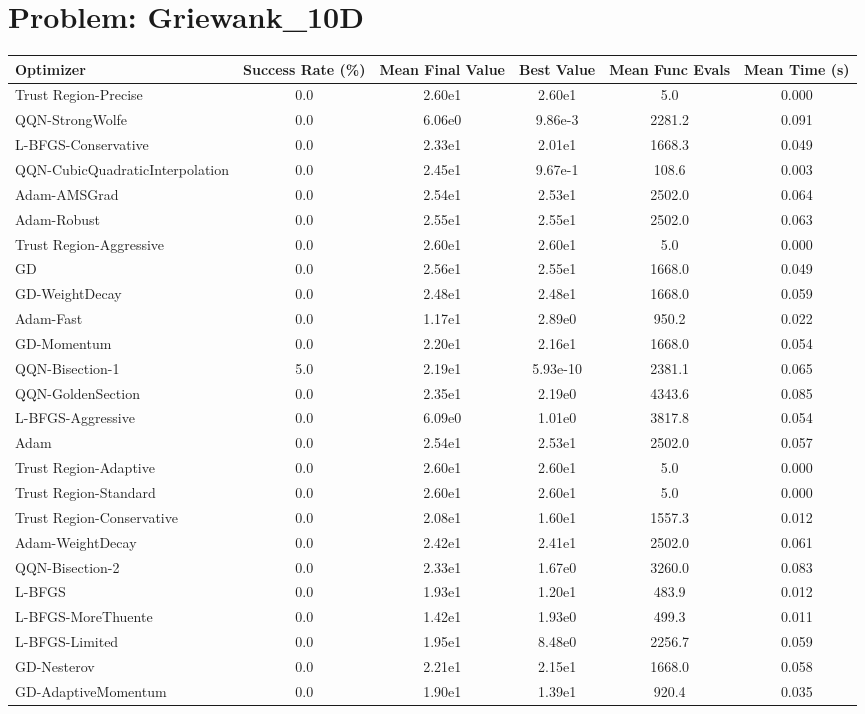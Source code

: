 \documentclass{article}
\begin{document}
\section{Problem: Griewank\_10D}
\begin{longtable}{p{3cm}*{5}{c}}
\toprule
\textbf{Optimizer} & \textbf{Success Rate (\%)} & \textbf{Mean Final Value} & \textbf{Best Value} & \textbf{Mean Func Evals} & \textbf{Mean Time (s)} \\
\midrule
Trust Region-Precise & 0.0 & 2.60e1 & 2.60e1 & 5.0 & 0.000 \\
QQN-StrongWolfe & 0.0 & 6.06e0 & 9.86e-3 & 2281.2 & 0.091 \\
L-BFGS-Conservative & 0.0 & 2.33e1 & 2.01e1 & 1668.3 & 0.049 \\
QQN-CubicQuadraticInterpolation & 0.0 & 2.45e1 & 9.67e-1 & 108.6 & 0.003 \\
Adam-AMSGrad & 0.0 & 2.54e1 & 2.53e1 & 2502.0 & 0.064 \\
Adam-Robust & 0.0 & 2.55e1 & 2.55e1 & 2502.0 & 0.063 \\
Trust Region-Aggressive & 0.0 & 2.60e1 & 2.60e1 & 5.0 & 0.000 \\
GD & 0.0 & 2.56e1 & 2.55e1 & 1668.0 & 0.049 \\
GD-WeightDecay & 0.0 & 2.48e1 & 2.48e1 & 1668.0 & 0.059 \\
Adam-Fast & 0.0 & 1.17e1 & 2.89e0 & 950.2 & 0.022 \\
GD-Momentum & 0.0 & 2.20e1 & 2.16e1 & 1668.0 & 0.054 \\
QQN-Bisection-1 & 5.0 & 2.19e1 & 5.93e-10 & 2381.1 & 0.065 \\
QQN-GoldenSection & 0.0 & 2.35e1 & 2.19e0 & 4343.6 & 0.085 \\
L-BFGS-Aggressive & 0.0 & 6.09e0 & 1.01e0 & 3817.8 & 0.054 \\
Adam & 0.0 & 2.54e1 & 2.53e1 & 2502.0 & 0.057 \\
Trust Region-Adaptive & 0.0 & 2.60e1 & 2.60e1 & 5.0 & 0.000 \\
Trust Region-Standard & 0.0 & 2.60e1 & 2.60e1 & 5.0 & 0.000 \\
Trust Region-Conservative & 0.0 & 2.08e1 & 1.60e1 & 1557.3 & 0.012 \\
Adam-WeightDecay & 0.0 & 2.42e1 & 2.41e1 & 2502.0 & 0.061 \\
QQN-Bisection-2 & 0.0 & 2.33e1 & 1.67e0 & 3260.0 & 0.083 \\
L-BFGS & 0.0 & 1.93e1 & 1.20e1 & 483.9 & 0.012 \\
L-BFGS-MoreThuente & 0.0 & 1.42e1 & 1.93e0 & 499.3 & 0.011 \\
L-BFGS-Limited & 0.0 & 1.95e1 & 8.48e0 & 2256.7 & 0.059 \\
GD-Nesterov & 0.0 & 2.21e1 & 2.15e1 & 1668.0 & 0.058 \\
GD-AdaptiveMomentum & 0.0 & 1.90e1 & 1.39e1 & 920.4 & 0.035 \\
\bottomrule
\end{longtable}
\end{document}
